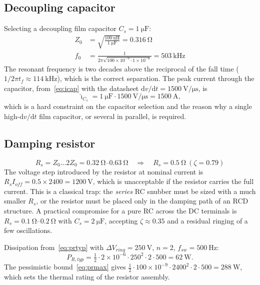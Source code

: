 \documentclass[11pt,a4paper]{article}
\begin{document}
\subsection{Decoupling capacitor}

Selecting a decoupling film capacitor $C_s = \SI{1}{\micro\farad}$:
\begin{align}
Z_0 &= \sqrt{\frac{\SI{100}{\nano\henry}}{\SI{1}{\micro\farad}}}
     = \SI{0.316}{\ohm} \\
f_0 &= \frac{1}{2\pi\sqrt{100\times10^{-9}\cdot 1\times10^{-6}}}
     = \SI{503}{\kilo\hertz}
\end{align}
The resonant frequency is two decades above the reciprocal of the fall time
($1/2\pi t_f \approx \SI{114}{\kilo\hertz}$), which is the correct
separation. The peak current through the capacitor,
from~\eqref{eq:icap} with the datasheet
$\mathrm{d}v/\mathrm{d}t = \SI{1500}{\volt\per\micro\second}$, is
\begin{equation}
\hat\imath_{C_s} = \SI{1}{\micro\farad}\cdot\SI{1500}{\volt\per\micro\second}
= \SI{1500}{\ampere},
\end{equation}
which is a hard constraint on the capacitor selection and the reason why a
single high-$\mathrm{d}v/\mathrm{d}t$ film capacitor, or several in parallel,
is required.

\subsection{Damping resistor}

\begin{equation}
R_s = Z_0 \ldots 2Z_0 = \SIrange{0.32}{0.63}{\ohm}
\quad\Rightarrow\quad R_s = \SI{0.5}{\ohm}\ (\zeta = 0.79)
\end{equation}
The voltage step introduced by the resistor at nominal current is
$R_s I_{off} = 0.5\times 2400 = \SI{1200}{\volt}$, which is unacceptable if
the resistor carries the full current. This is a classical trap: the
\emph{series} RC snubber must be sized with a much smaller $R_s$, or the
resistor must be placed only in the damping path of an RCD structure. A
practical compromise for a pure RC across the DC terminals is
$R_s = \SIrange{0.1}{0.2}{\ohm}$ with $C_s = \SI{2}{\micro\farad}$, accepting
$\zeta \approx 0.35$ and a residual ringing of a few oscillations.

Dissipation from~\eqref{eq:prtyp} with $\Delta V_{ring} = \SI{250}{\volt}$,
$n=2$, $f_{sw}=\SI{500}{\hertz}$:
\begin{equation}
P_{R,typ} = \tfrac{1}{2}\cdot 2\times10^{-6}\cdot 250^{2}\cdot 2\cdot 500
= \SI{62}{\watt}.
\end{equation}
The pessimistic bound~\eqref{eq:prmax} gives
$\tfrac12\cdot100\times10^{-9}\cdot2400^{2}\cdot2\cdot500 = \SI{288}{\watt}$,
which sets the thermal rating of the resistor assembly.
\end{document}
